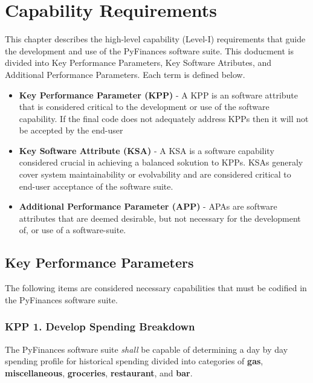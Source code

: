 \chapter{Capability Requirements}

This chapter describes the high-level capability (Level-I) requirements that guide the 
development and use of the PyFinances software suite.  This doducment is divided into
Key Performance Parameters, Key Software Atributes, and Additional Performance Parameters.
Each term is defined below.

\begin{itemize}
    \item {\textbf{Key Performance Parameter (KPP)}} - A KPP is an software attribute 
that is considered critical to the development or use of the software capability.  If 
the final code does not adequately address KPPs then it will not be accepted by the 
end-user
    \item {\textbf{Key Software Attribute (KSA)}} - A KSA is a software capability 
considered crucial in achieving a balanced sokution to KPPs.  KSAs generaly cover
system maintainability or evolvability and are considered critical to end-user
acceptance of the software suite.
    \item {\textbf{Additional Performance Parameter (APP)}} - APAs are software
attributes that are deemed desirable, but not necessary for the development of,
or use of a software-suite. 
\end{itemize}

\section{Key Performance Parameters}
The following items are considered necessary capabilities that must be codified in the 
PyFinances software suite.

\subsection{KPP 1. Develop Spending Breakdown}
The PyFinances software suite {\textit{shall}} be capable of determining a day
by day spending profile for historical spending divided into categories of
{\textbf{gas}}, {\textbf{miscellaneous}}, {\textbf{groceries}}, 
{\textbf{restaurant}}, and {\textbf{bar}}.


